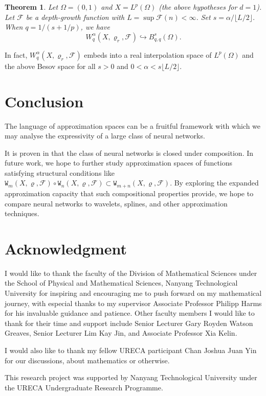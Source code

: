 \documentclass{article}
\newtheorem{theorem}{Theorem}[section]
\theoremstyle{definition}
\theoremstyle{remark}
\begin{document}
\begin{theorem}
    Let $\Omega = (0,1)$ and $X = L^p(\Omega)$ (the above hypotheses for $d = 1$). Let $\mathcal{F}$ be a depth-growth function with $L = \sup \mathcal{F}(n) < \infty$. Set $s = \alpha/\lfloor L/2 \rfloor$. When $q = 1/(s+1/p)$, we have
    \[W_q^\alpha(X,\varrho_r,\mathcal{F}) \hookrightarrow B_{q,q}^s(\Omega).\]
\end{theorem}

In fact, $W_q^\alpha(X,\varrho_r,\mathcal{F})$ embeds into a real interpolation space of $L^p(\Omega)$ and the above Besov space for all $s > 0$ and $0 < \alpha < s\lfloor L/2 \rfloor$.



\section{Conclusion}

The language of approximation spaces can be a fruitful framework with which we may analyse the expressivity of a large class of neural networks.

It is proven in \cite[Lemma 2.18]{gribonval_approximation_2022} that the class of neural networks is closed under composition. In future work, we hope to further study approximation spaces of functions satisfying structural conditions like $\mathtt{W}_m(X,\varrho,\mathcal{F}) \circ \mathtt{W}_n(X,\varrho,\mathcal{F}) \subset \mathtt{W}_{m+n}(X,\varrho,\mathcal{F})$. By exploring the expanded approximation capacity that such compositional properties provide, we hope to compare neural networks to wavelets, splines, and other approximation techniques.



\section*{Acknowledgment}

I would like to thank the faculty of the Division of Mathematical Sciences under the School of Physical and Mathematical Sciences, Nanyang Technological University for inspiring and encouraging me to push forward on my mathematical journey, with especial thanks to my supervisor Associate Professor Philipp Harms for his invaluable guidance and patience. Other faculty members I would like to thank for their time and support include Senior Lecturer Gary Royden Watson Greaves, Senior Lecturer Lim Kay Jin, and Associate Professor Xia Kelin.

I would also like to thank my fellow URECA participant Chan Joshua Juan Yin for our discussions, about mathematics or otherwise.

This research project was supported by Nanyang Technological University under the URECA Undergraduate Research Programme.

\printbibliography
\end{document}
